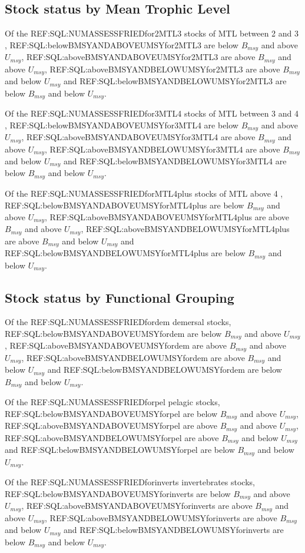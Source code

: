 \subsection*{Stock status by Mean Trophic Level}
Of the REF:SQL:NUMASSESSFRIEDfor2MTL3 stocks of MTL between 2 and 3 , REF:SQL:belowBMSYANDABOVEUMSYfor2MTL3 are below $B_{msy}$ and above $U_{msy}$, REF:SQL:aboveBMSYANDABOVEUMSYfor2MTL3 are above $B_{msy}$ and above $U_{msy}$, REF:SQL:aboveBMSYANDBELOWUMSYfor2MTL3 are above $B_{msy}$ and below $U_{msy}$ and REF:SQL:belowBMSYANDBELOWUMSYfor2MTL3 are below $B_{msy}$ and below $U_{msy}$.

Of the REF:SQL:NUMASSESSFRIEDfor3MTL4 stocks of MTL between 3 and 4 , REF:SQL:belowBMSYANDABOVEUMSYfor3MTL4 are below $B_{msy}$ and above $U_{msy}$, REF:SQL:aboveBMSYANDABOVEUMSYfor3MTL4 are above $B_{msy}$ and above $U_{msy}$, REF:SQL:aboveBMSYANDBELOWUMSYfor3MTL4 are above $B_{msy}$ and below $U_{msy}$ and REF:SQL:belowBMSYANDBELOWUMSYfor3MTL4 are below $B_{msy}$ and below $U_{msy}$.

Of the REF:SQL:NUMASSESSFRIEDforMTL4plus stocks of MTL above 4 , REF:SQL:belowBMSYANDABOVEUMSYforMTL4plus are below $B_{msy}$ and above $U_{msy}$, REF:SQL:aboveBMSYANDABOVEUMSYforMTL4plus are above $B_{msy}$ and above $U_{msy}$, REF:SQL:aboveBMSYANDBELOWUMSYforMTL4plus are above $B_{msy}$ and below $U_{msy}$ and REF:SQL:belowBMSYANDBELOWUMSYforMTL4plus are below $B_{msy}$ and below $U_{msy}$.

\subsection*{Stock status by Functional Grouping}
Of the REF:SQL:NUMASSESSFRIEDfordem demersal stocks, REF:SQL:belowBMSYANDABOVEUMSYfordem are below $B_{msy}$ and above $U_{msy}$, REF:SQL:aboveBMSYANDABOVEUMSYfordem are above $B_{msy}$ and above $U_{msy}$, REF:SQL:aboveBMSYANDBELOWUMSYfordem are above $B_{msy}$ and below $U_{msy}$ and REF:SQL:belowBMSYANDBELOWUMSYfordem are below $B_{msy}$ and below $U_{msy}$.

Of the REF:SQL:NUMASSESSFRIEDforpel pelagic stocks, REF:SQL:belowBMSYANDABOVEUMSYforpel are below $B_{msy}$ and above $U_{msy}$, REF:SQL:aboveBMSYANDABOVEUMSYforpel are above $B_{msy}$ and above $U_{msy}$, REF:SQL:aboveBMSYANDBELOWUMSYforpel are above $B_{msy}$ and below $U_{msy}$ and REF:SQL:belowBMSYANDBELOWUMSYforpel are below $B_{msy}$ and below $U_{msy}$.

Of the REF:SQL:NUMASSESSFRIEDforinverts invertebrates stocks, REF:SQL:belowBMSYANDABOVEUMSYforinverts are below $B_{msy}$ and above $U_{msy}$, REF:SQL:aboveBMSYANDABOVEUMSYforinverts are above $B_{msy}$ and above $U_{msy}$, REF:SQL:aboveBMSYANDBELOWUMSYforinverts are above $B_{msy}$ and below $U_{msy}$ and REF:SQL:belowBMSYANDBELOWUMSYforinverts are below $B_{msy}$ and below $U_{msy}$.

